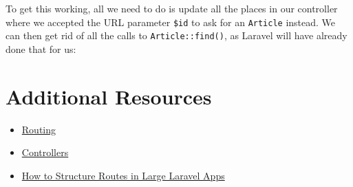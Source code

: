 To get this working, all we need to do is update all the places in our controller where we accepted the URL parameter \texttt{\$id} to ask for an \texttt{Article} instead. We can then get rid of all the calls to \texttt{Article::find()}, as Laravel will have already done that for us:




\section{Additional Resources}

\begin{itemize}[leftmargin=*]
    \item \href{https://laravel.com/docs/master/routing}{Routing}
    \item \href{http://laravel.com/docs/master/controllers}{Controllers}
    \item \href{https://laraveldaily.com/how-to-structure-routes-in-large-laravel-projects/}{How to Structure Routes in Large Laravel Apps}
\end{itemize}
